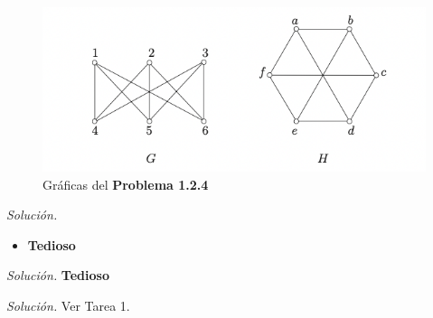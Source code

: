 \documentclass[12pt]{article}
\newenvironment{problem}[2][Problema]{\begin{trivlist}
\item[\hskip \labelsep {\bfseries #1}\hskip \labelsep {\bfseries #2}]}{\end{trivlist}}
\begin{document}
\begin{figure}
    \centering
    \includegraphics[scale=0.65]{pics/p1.2.4.png}
    \caption{Gráficas del \textbf{Problema 1.2.4}}
    \label{fig:p1.2.4}
\end{figure}

\begin{problem}{1.2.4}

\end{problem}
\textit{Solución.} \begin{itemize}
    \item[a)]  \textbf{Tedioso}
\end{itemize}

\begin{problem}{1.2.6}

\end{problem}
\textit{Solución.} \textbf{Tedioso}

\begin{problem}{1.2.7}

\end{problem}
\textit{Solución.} Ver Tarea 1.
\end{document}
